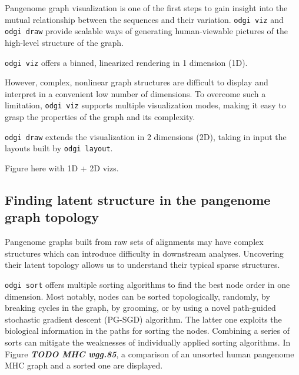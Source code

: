 \documentclass{bioinfo}
\begin{document}


Pangenome graph visualization is one of the first steps to gain insight into the mutual relationship between the sequences and their variation.
\texttt{odgi viz} and \texttt{odgi draw} provide scalable ways of generating human-viewable pictures of the high-level structure of the graph.

\texttt{odgi viz} offers a binned, linearized rendering in 1 dimension (1D).


However, complex, nonlinear graph structures are difficult to display and interpret in a convenient low number of dimensions.
To overcome such a limitation, \texttt{odgi viz} supports multiple visualization modes, making it easy to grasp the properties of the graph and its complexity.


\texttt{odgi draw} extends the visualization in 2 dimensions (2D), taking in input the layouts built by \texttt{odgi layout}.


Figure here with 1D + 2D vizs.

\subsection{Finding latent structure in the pangenome graph topology}




Pangenome graphs built from raw sets of alignments may have complex structures which can introduce difficulty in downstream analyses. Uncovering their latent topology allows us to understand their typical sparse structures.

\texttt{odgi sort} offers multiple sorting algorithms to find the best node order in one dimension. Most notably, nodes can be sorted topologically, randomly, by breaking cycles in the graph, by grooming, or by using a novel path-guided stochastic gradient descent (PG-SGD) algorithm. 
The latter one exploits the biological information in the paths for sorting the nodes.
Combining a series of sorts can mitigate the weaknesses of individually applied sorting algorithms. 
In Figure \textbf{\textit{TODO MHC wgg.85}}, a comparison of an unsorted human pangenome MHC graph and a sorted one are displayed.
\end{document}
